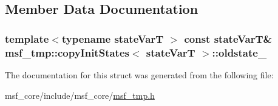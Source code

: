 \subsection{Member Data Documentation}
\hypertarget{structmsf__tmp_1_1copyInitStates_a408292aa7f46627750a4232abdb8559d}{
\subsubsection[{oldstate\-\_\-}]{\setlength{\rightskip}{0pt plus 5cm}template$<$typename state\-Var\-T $>$ const state\-Var\-T\& {\bf msf\-\_\-tmp\-::copy\-Init\-States}$<$ state\-Var\-T $>$\-::oldstate\-\_\-\hspace{0.3cm}{\ttfamily [private]}}}\label{structmsf__tmp_1_1copyInitStates_a408292aa7f46627750a4232abdb8559d}


The documentation for this struct was generated from the following file\-:\begin{DoxyCompactItemize}
\item 
msf\-\_\-core/include/msf\-\_\-core/\hyperlink{msf__tmp_8h}{msf\-\_\-tmp.\-h}\end{DoxyCompactItemize}
